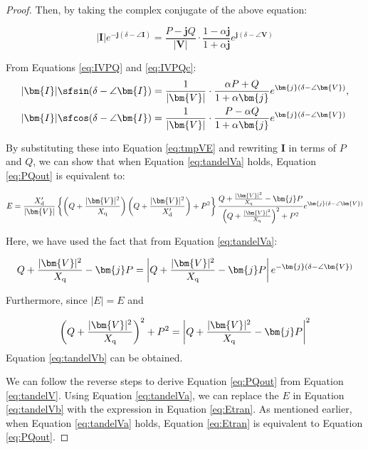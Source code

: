 \documentclass[graybox, envcountchap]{svmult}
\begin{document}
\begin{proof}
Then, by taking the complex conjugate of the above equation:

\begin{equation}\label{eq:IVPQc}
|\bm{I}|e^{-\bm{j}(\delta - \angle \bm{I})} = \frac{P-\bm{j}Q}{|\bm{V}|}  
\cdot \frac{1-\alpha \bm{j}}{1+\alpha \bm{j}}
e^{\bm{j}(\delta - \angle \bm{V})}
\end{equation}

From Equations \ref{eq:IVPQ} and \ref{eq:IVPQc}:
\begin{align*}
  |\bm{I}| \sfsin (\delta - \angle \bm{I})
  & =
  \frac{1}{|\bm{V}|} \cdot
  \frac{\alpha P +Q}{ 1+\alpha \bm{j} }e^{\bm{j}(\delta - \angle \bm{V})}, \\
  |\bm{I}| \sfcos (\delta - \angle \bm{I})
  & =
  \frac{1}{|\bm{V}|} \cdot
  \frac{ P - \alpha Q}{ 1+\alpha \bm{j} }e^{\bm{j}(\delta - \angle \bm{V})}
\end{align*}

By substituting these into Equation \ref{eq:tmpVE} and rewriting $\bm{I}$ in
terms of $P$ and $Q$, we can show that when Equation \ref{eq:tandelVa} holds,
Equation \ref{eq:PQout} is equivalent to:

\begin{equation}\label{eq:Etran}
  E=
  \frac{X_{\rm d}'}{|\bm{V}| } 
  \left\{
    \left(Q + \frac{|\bm{V}|^2}{X_{\rm q}} \right) \left(Q + \frac{|\bm{V}|^2}{X_{\rm d}'} \right) +P^2
  \right\}
  \frac{  Q + \tfrac{|\bm{V}|^2}{X_{\rm q}} - \bm{j} P }{   \left( Q + \tfrac{|\bm{V}|^2}{X_{\rm q}} \right)^2 + P^2   }
  e^{\bm{j}(\delta - \angle \bm{V})}
\end{equation}

Here, we have used the fact that from Equation \ref{eq:tandelVa}:

\begin{equation*}
  Q + \frac{|\bm{V}|^2}{X_{\rm q}} - \bm{j} P
  = 
  \left|Q + \frac{|\bm{V}|^2}{X_{\rm q}} - \bm{j} P \right|
  e^{-\bm{j}(\delta - \angle \bm{V})}
\end{equation*}

Furthermore, since $|E|=E$ and

\[
\left( Q + \frac{|\bm{V}|^2}{X_{\rm q}} \right)^2 + P^2
=
\left|Q + \frac{|\bm{V}|^2}{X_{\rm q}} - \bm{j} P \right|^2
\]
Equation \ref{eq:tandelVb} can be obtained.

We can follow the reverse steps to derive Equation \ref{eq:PQout} from Equation
\ref{eq:tandelV}. Using Equation \ref{eq:tandelVa}, we can replace the $E$ in
Equation \ref{eq:tandelVb} with the expression in Equation \ref{eq:Etran}. As
mentioned earlier, when Equation \ref{eq:tandelVa} holds, Equation
\ref{eq:Etran} is equivalent to Equation \ref{eq:PQout}.
\end{proof}
\end{document}
